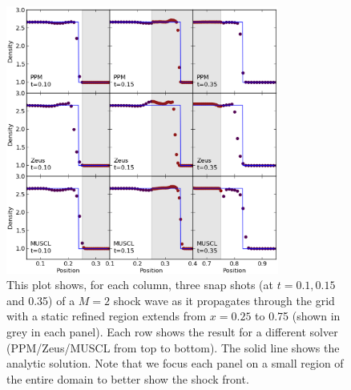 \begin{figure}
\begin{center}
\includegraphics[width=0.8\textwidth]{figures/ShockPool}
\caption{This plot shows, for each column, three snap shots (at $t=0.1, 0.15$ and 0.35) of a $M=2$ shock wave as it propagates through the grid with a static refined region extends from $x = 0.25$ to 0.75 (shown in grey in each panel).   Each row shows the result for a different solver (PPM/Zeus/MUSCL from top to bottom).  The solid line shows the analytic solution.  Note that we focus each panel on a small region of the entire domain to better show the shock front.}
\label{fig.shockpool}
\end{center}
\end{figure}
